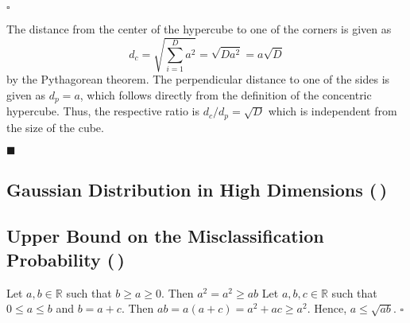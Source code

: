 \documentclass[11pt, a4paper]{scrartcl}
\newcommand{\R}{\mathbb{R}}
\newcommand{\qed}{\hfill\(\square\)}
\newcommand{\eot}{\hfill\(\blacksquare\)}
\newcommand{\diffstar}{\texorpdfstring{\raisebox{-1pt}{\resizebox{!}{8pt}{\(\star\)}}}{*}}
\newcommand{\twostar}  {(\diffstar\,\diffstar)}
\begin{document}
			\qed

			The distance from the center of the hypercube to one of the corners is given as
			\begin{equation}
				d_c = \sqrt{\sum_{i = 1}^{D} a^2} = \sqrt{D a^2} = a \sqrt{D}
			\end{equation}
			by the Pythagorean theorem. The perpendicular distance to one of the sides is given as \(d_p = a\), which follows directly from the definition of the concentric hypercube. Thus, the respective ratio is \( d_c/d_p = \sqrt{D} \) which is independent from the size of the cube.

			\eot

		\subsection{Gaussian Distribution in High Dimensions  \twostar}

		\subsection{Upper Bound on the Misclassification Probability  \twostar}
			Let \( a, b \in \R \) such that \( b \geq a \geq 0 \). Then \( a^2 = a^2 \geq ab \)
			Let \( a, b, c \in \R \) such that \( 0 \leq a \leq b \) and \( b = a + c \). Then \( ab = a (a + c) = a^2 + ac \geq a^2 \). Hence, \( a \leq \sqrt{ab} \).
			\qed
\end{document}
